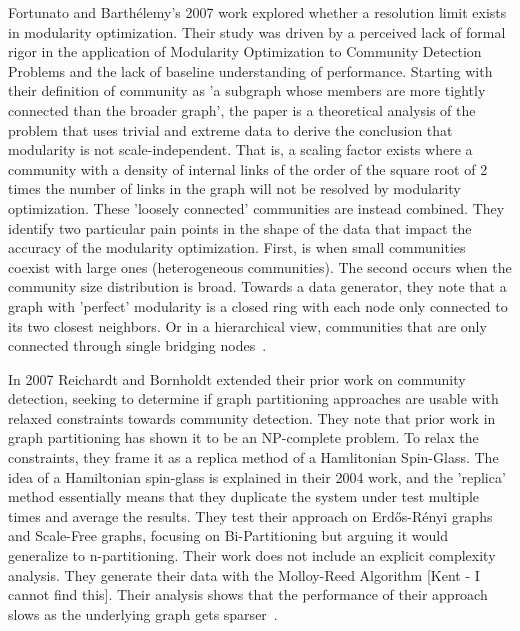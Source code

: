 \par{Fortunato and Barthélemy's 2007 work explored whether a resolution limit exists in modularity optimization. 
Their study was driven by a perceived lack of formal rigor in the application of Modularity Optimization to Community Detection Problems and the lack of baseline understanding of performance. 
Starting with their definition of community as 'a subgraph whose members are more tightly connected than the broader graph', the paper is a theoretical analysis of the problem that uses trivial and extreme data to derive the conclusion that modularity is not scale-independent. 
That is, a scaling factor exists where a community with a density of internal links of the order of the square root of 2 times the number of links in the graph will not be resolved by modularity optimization. 
These 'loosely connected' communities are instead combined. 
They identify two particular pain points in the shape of the data that impact the accuracy of the modularity optimization. 
First, is when small communities coexist with large ones (heterogeneous communities). 
The second occurs when the community size distribution is broad. 
Towards a data generator, they note that a graph with 'perfect' modularity is a closed ring with each node only connected to its two closest neighbors. 
Or in a hierarchical view, communities that are only connected through single bridging nodes~\cite{Fortunato2007}.}

\par{In 2007 Reichardt and Bornholdt extended their prior work on community detection, seeking to determine if graph partitioning approaches are usable with relaxed constraints towards community detection. 
They note that prior work in graph partitioning has shown it to be an NP-complete problem. 
To relax the constraints, they frame it as a replica method of a Hamlitonian Spin-Glass. 
The idea of a Hamiltonian spin-glass is explained in their 2004 work, and the 'replica' method essentially means that they duplicate the system under test multiple times and average the results. 
They test their approach on Erdős-Rényi graphs and Scale-Free graphs, focusing on Bi-Partitioning but arguing it would generalize to n-partitioning.
Their work does not include an explicit complexity analysis. 
They generate their data with the Molloy-Reed Algorithm [Kent - I cannot find this]. 
Their analysis shows that the performance of their approach slows as the underlying graph gets sparser~\cite{Reichardt2007}.}

